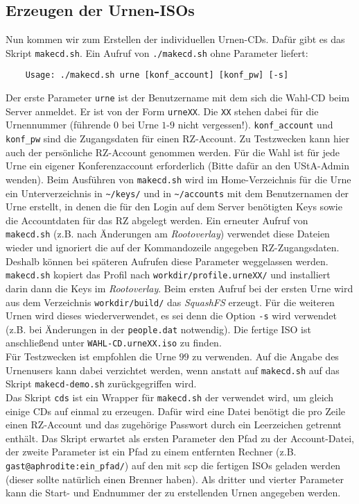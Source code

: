 \documentclass[a4paper,10pt]{article}
\begin{document}
\subsection{Erzeugen der Urnen-ISOs}
Nun kommen wir zum Erstellen der individuellen Urnen-CDs. Dafür gibt es das Skript \texttt{makecd.sh}. Ein Aufruf von \texttt{./makecd.sh} ohne Parameter liefert:
\begin{verbatim}
	Usage: ./makecd.sh urne [konf_account] [konf_pw] [-s]
\end{verbatim}
Der erste Parameter \texttt{urne} ist der Benutzername mit dem sich die Wahl-CD beim Server anmeldet. Er ist von der Form \texttt{urneXX}. Die \texttt{XX} stehen dabei für die Urnennummer (führende $0$ bei Urne $1$-$9$ nicht vergessen!). \texttt{konf\_account} und \texttt{konf\_pw} sind die Zugangsdaten für einen RZ-Account. Zu Testzwecken kann hier auch der persönliche RZ-Account genommen werden. Für die Wahl ist für jede Urne ein eigener Konferenzaccount erforderlich (Bitte dafür an den UStA-Admin wenden). Beim Ausführen von \texttt{makecd.sh} wird im Home-Verzeichnis für die Urne ein Unterverzeichnis in \texttt{\textasciitilde/keys/} und in \texttt{\textasciitilde/accounts} mit dem Benutzernamen der Urne erstellt, in denen die für den Login auf dem Server benötigten Keys sowie die Accountdaten für das RZ abgelegt werden. Ein erneuter Aufruf von \texttt{makecd.sh} (z.B. nach Änderungen am \textit{Rootoverlay}) verwendet diese Dateien wieder und ignoriert die auf der Kommandozeile angegeben RZ-Zugangsdaten. Deshalb können bei späteren Aufrufen diese Parameter weggelassen werden. \texttt{makecd.sh} kopiert das Profil nach \texttt{workdir/profile.urneXX/} und installiert darin dann die Keys im \textit{Rootoverlay}.
Beim ersten Aufruf bei der ersten Urne wird aus dem Verzeichnis \texttt{workdir/build/} das \textit{SquashFS} erzeugt. Für die weiteren Urnen wird dieses wiederverwendet, es sei denn die Option \texttt{-s} wird verwendet (z.B. bei Änderungen in der \texttt{people.dat} notwendig).
Die fertige ISO ist anschließend unter \texttt{WAHL-CD.urneXX.iso} zu finden. \\
Für Testzwecken ist empfohlen die Urne $99$ zu verwenden. Auf die Angabe des Urnenusers kann dabei verzichtet werden, wenn anstatt auf \texttt{makecd.sh} auf das Skript \texttt{makecd-demo.sh} zurückgegriffen wird. \\
Das Skript \texttt{cds} ist ein Wrapper für \texttt{makecd.sh} der verwendet wird, um gleich einige CDs auf einmal zu erzeugen. Dafür wird eine Datei benötigt die pro Zeile einen RZ-Account und das zugehörige Passwort durch ein Leerzeichen getrennt enthält. Das Skript erwartet als ersten Parameter den Pfad zu der Account-Datei, der zweite Parameter ist ein Pfad zu einem entfernten Rechner (z.B. \texttt{gast@aphrodite:ein\_pfad/}) auf den mit scp die fertigen ISOs geladen werden (dieser sollte natürlich einen Brenner haben). Als dritter und vierter Parameter kann die Start- und Endnummer der zu erstellenden Urnen angegeben werden.
\end{document}
